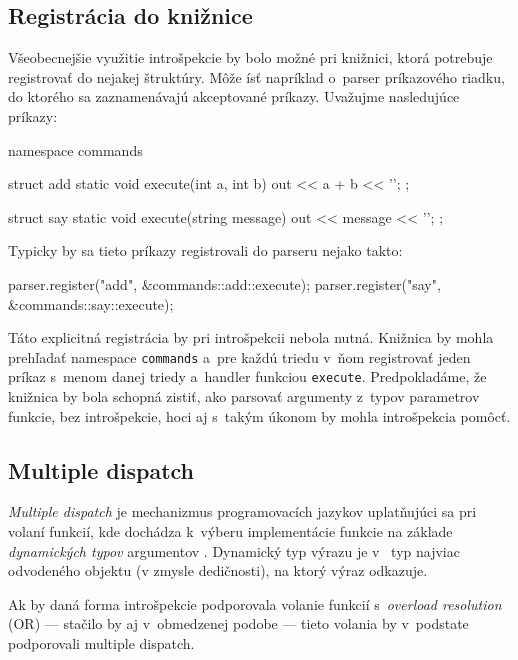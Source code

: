 \subsection{Registrácia do knižnice}

Všeobecnejšie využitie introšpekcie by bolo možné pri knižnici, ktorá potrebuje registrovať do nejakej štruktúry. Môže ísť napríklad o~parser príkazového riadku, do ktorého sa zaznamenávajú akceptované príkazy. Uvažujme nasledujúce príkazy:

\newpage

\begin{code}
namespace commands
{   struct add
    {   static void execute(int a, int b)
        { out << a + b << '\n'; }
    };
    
    struct say
    {   static void execute(string message)
        { out << message << '\n'; }
    };
}
\end{code}
Typicky by sa tieto príkazy registrovali do parseru nejako takto:
\begin{code}
parser.register("add", &commands::add::execute);
parser.register("say", &commands::say::execute);
\end{code}

Táto explicitná registrácia by pri introšpekcii nebola nutná. Knižnica by mohla prehľadať namespace \texttt{commands} a~pre každú triedu v~ňom registrovať jeden príkaz s~menom danej triedy a~handler funkciou \texttt{execute}. Predpokladáme, že knižnica by bola schopná zistiť, ako parsovať argumenty z~typov parametrov funkcie, bez introšpekcie, hoci aj s~takým úkonom by mohla introšpekcia pomôcť.

\subsection{Multiple dispatch}

\emph{Multiple dispatch} je mechanizmus programovacích jazykov uplatňujúci sa pri volaní funkcií, kde dochádza k~výberu implementácie funkcie na základe \emph{dynamických typov} argumentov \citep*{muschevici2008multiple}. Dynamický typ výrazu je v~\Cpp{} typ najviac odvodeného objektu (v zmysle dedičnosti), na ktorý výraz odkazuje.

Ak by daná forma introšpekcie podporovala volanie funkcií s~\emph{overload resolution} (OR) --- stačilo by aj v~obmedzenej podobe --- tieto volania by v~podstate podporovali multiple dispatch.

